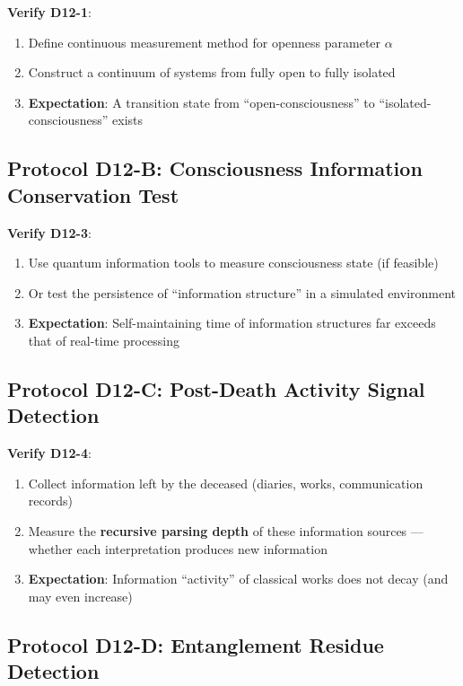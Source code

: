 \documentclass[12pt,a4paper]{article}
\begin{document}
\textbf{Verify D12-1}:
\begin{enumerate}
    \item Define continuous measurement method for openness parameter $\alpha$
    \item Construct a continuum of systems from fully open to fully isolated
    \item \textbf{Expectation}: A transition state from ``open-consciousness'' to ``isolated-consciousness'' exists
\end{enumerate}

\subsection{Protocol D12-B: Consciousness Information Conservation Test}

\textbf{Verify D12-3}:
\begin{enumerate}
    \item Use quantum information tools to measure consciousness state (if feasible)
    \item Or test the persistence of ``information structure'' in a simulated environment
    \item \textbf{Expectation}: Self-maintaining time of information structures far exceeds that of real-time processing
\end{enumerate}

\subsection{Protocol D12-C: Post-Death Activity Signal Detection}

\textbf{Verify D12-4}:
\begin{enumerate}
    \item Collect information left by the deceased (diaries, works, communication records)
    \item Measure the \textbf{recursive parsing depth} of these information sources --- whether each interpretation produces new information
    \item \textbf{Expectation}: Information ``activity'' of classical works does not decay (and may even increase)
\end{enumerate}

\subsection{Protocol D12-D: Entanglement Residue Detection}
\end{document}
